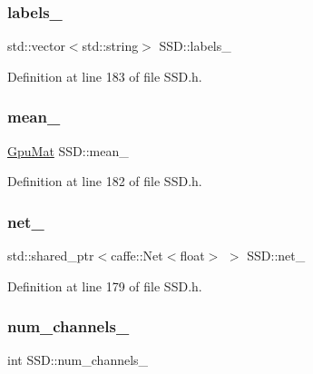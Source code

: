 \subsubsection{\texorpdfstring{labels\+\_\+}{labels\_}}
{\footnotesize\ttfamily std\+::vector$<$std\+::string$>$ S\+S\+D\+::labels\+\_\+\hspace{0.3cm}{\ttfamily [private]}}



Definition at line 183 of file S\+S\+D.\+h.

\mbox{\label{class_s_s_d_a3974a4a620cee93f5523c459482887e2}} 
\subsubsection{\texorpdfstring{mean\+\_\+}{mean\_}}
{\footnotesize\ttfamily \mbox{\hyperlink{gpu__allocator_8h_aa7700da124206551c0f9d273152f13fb}{Gpu\+Mat}} S\+S\+D\+::mean\+\_\+\hspace{0.3cm}{\ttfamily [private]}}



Definition at line 182 of file S\+S\+D.\+h.

\mbox{\label{class_s_s_d_a9b70501b85252c3135030e5c6c1e7117}} 
\subsubsection{\texorpdfstring{net\+\_\+}{net\_}}
{\footnotesize\ttfamily std\+::shared\+\_\+ptr$<$caffe\+::\+Net$<$float$>$ $>$ S\+S\+D\+::net\+\_\+\hspace{0.3cm}{\ttfamily [private]}}



Definition at line 179 of file S\+S\+D.\+h.

\mbox{\label{class_s_s_d_affe6f7e948b0040bd958db34758d8ab1}} 
\subsubsection{\texorpdfstring{num\+\_\+channels\+\_\+}{num\_channels\_}}
{\footnotesize\ttfamily int S\+S\+D\+::num\+\_\+channels\+\_\+\hspace{0.3cm}{\ttfamily [private]}}



